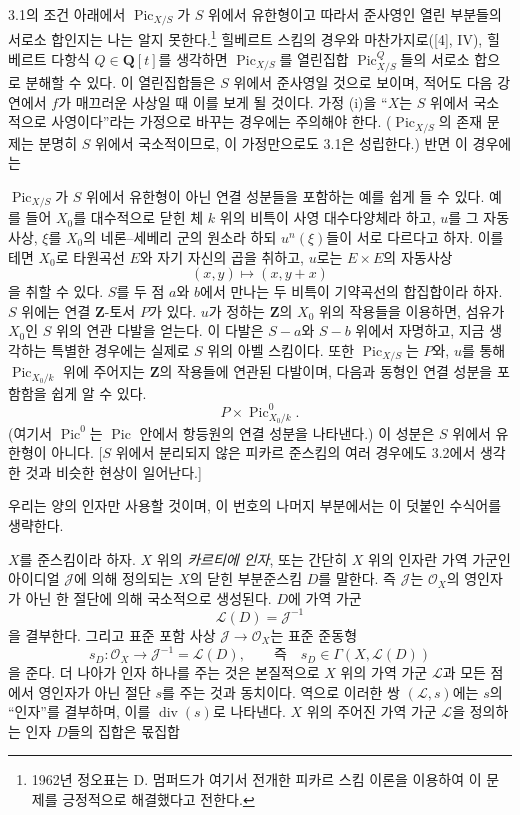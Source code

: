  3.1의 조건 아래에서 $\operatorname{Pic}_{X/S}$가
$S$ 위에서 유한형이고 따라서 준사영인 열린 부분들의 서로소 합인지는
나는 알지 못한다.\footnote{1962년 정오표는 D. 멈퍼드가 여기서 전개한
피카르 스킴 이론을 이용하여 이 문제를 긍정적으로 해결했다고 전한다.}
힐베르트 스킴의 경우와 마찬가지로([4], IV), 힐베르트 다항식
$Q\in\mathbf Q[t]$를 생각하면 $\operatorname{Pic}_{X/S}$를 열린집합
$\operatorname{Pic}^{Q}_{X/S}$들의 서로소 합으로 분해할 수 있다. 이
열린집합들은 $S$ 위에서 준사영일 것으로 보이며, 적어도 다음 강연에서
$f$가 매끄러운 사상일 때 이를 보게 될 것이다. 가정 (i)을 ``$X$는
$S$ 위에서 국소적으로 사영이다''라는 가정으로 바꾸는 경우에는 주의해야
한다. ($\operatorname{Pic}_{X/S}$의 존재 문제는 분명히 $S$ 위에서
국소적이므로, 이 가정만으로도 3.1은 성립한다.) 반면 이 경우에는

$\operatorname{Pic}_{X/S}$가 $S$ 위에서 유한형이 아닌 연결 성분들을
포함하는 예를 쉽게 들 수 있다. 예를 들어 $X_0$를 대수적으로 닫힌 체
$k$ 위의 비특이 사영 대수다양체라 하고, $u$를 그 자동사상, $\xi$를
$X_0$의 네론--세베리 군의 원소라 하되 $u^n(\xi)$들이 서로 다르다고
하자. 이를테면 $X_0$로 타원곡선 $E$와 자기 자신의 곱을 취하고, $u$로는
$E\times E$의 자동사상
\[
(x,y)\longmapsto(x,y+x)
\]
을 취할 수 있다. $S$를 두 점 $a$와 $b$에서 만나는 두 비특이 기약곡선의
합집합이라 하자. $S$ 위에는 연결 $\mathbf Z$-토서 $P$가 있다.
$u$가 정하는 $\mathbf Z$의 $X_0$ 위의 작용들을 이용하면, 섬유가 $X_0$인
$S$ 위의 연관 다발을 얻는다. 이 다발은 $S-a$와 $S-b$ 위에서 자명하고,
지금 생각하는 특별한 경우에는 실제로 $S$ 위의 아벨 스킴이다. 또한
$\operatorname{Pic}_{X/S}$는 $P$와, $u$를 통해
$\operatorname{Pic}_{X_0/k}$ 위에 주어지는 $\mathbf Z$의 작용들에
연관된 다발이며, 다음과 동형인 연결 성분을 포함함을 쉽게 알 수 있다.
\[
P\times\operatorname{Pic}^{0}_{X_0/k}.
\]
(여기서 $\operatorname{Pic}^{0}$는 $\operatorname{Pic}$ 안에서 항등원의
연결 성분을 나타낸다.) 이 성분은 $S$ 위에서 유한형이 아니다. [$S$ 위에서
분리되지 않은 피카르 준스킴의 여러 경우에도 3.2에서 생각한 것과 비슷한
현상이 일어난다.]


우리는 양의 인자만 사용할 것이며, 이 번호의 나머지 부분에서는 이
덧붙인 수식어를 생략한다.

$X$를 준스킴이라 하자. $X$ 위의 \emph{카르티에 인자}, 또는 간단히
$X$ 위의 인자란 가역 가군인 아이디얼 $\mathcal J$에 의해 정의되는
$X$의 닫힌 부분준스킴 $D$를 말한다. 즉 $\mathcal J$는
$\mathcal O_X$의 영인자가 아닌 한 절단에 의해 국소적으로 생성된다.
$D$에 가역 가군
\[
\mathcal L(D)=\mathcal J^{-1}
\]
을 결부한다. 그리고 표준 포함 사상
$\mathcal J\longrightarrow\mathcal O_X$는 표준 준동형
\[
s_D:\mathcal O_X\longrightarrow\mathcal J^{-1}=\mathcal L(D),
\qquad\text{즉}\quad s_D\in\Gamma(X,\mathcal L(D))
\]
을 준다. 더 나아가 인자 하나를 주는 것은 본질적으로 $X$ 위의 가역 가군
$\mathcal L$과 모든 점에서 영인자가 아닌 절단 $s$를 주는 것과 동치이다.
역으로 이러한 쌍 $(\mathcal L,s)$에는 $s$의 ``인자''를 결부하며, 이를
$\operatorname{div}(s)$로 나타낸다. $X$ 위의 주어진 가역 가군
$\mathcal L$을 정의하는 인자 $D$들의 집합은 몫집합

